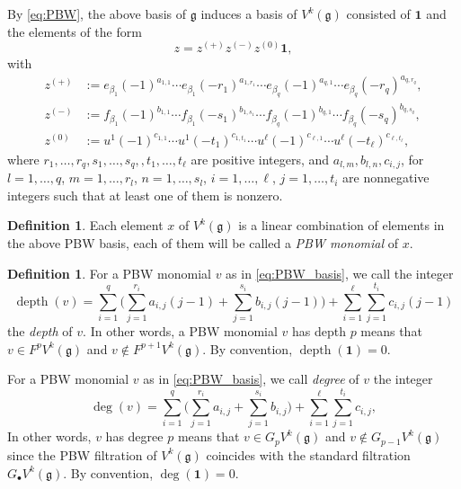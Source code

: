 \documentclass[11pt]{article}
\numberwithin{equation}{section}
\newcommand{\sbullet}{{\scriptscriptstyle\bullet}}
\let\be\beta
\DeclareMathOperator{\dep}{depth}
\newcommand \g{\mathfrak g}
\theoremstyle{definition}
\newtheorem{defn}[theorem]{Definition}
\begin{document}
By \eqref{eq:PBW},
the above basis of $\g$
induces a basis of $V^k(\g)$ consisted of $\mathbf{1}$
and the elements of the form
\begin{equation}
\label{eq:PBW_basis}
z = z^{(+)} z^{(-)} z^{(0)} \mathbf{1},
\end{equation}
with
\begin{align*}
z^{(+)} &:= e_{\be_{1}}(-1)^{a_{1,1}}\cdots
e_{\be_{1}} (- r_1)^{a_{1,r_1}}\cdots
e_{\be_q}(- 1)^{a_{q,1}}\cdots e_{\be_q}(- r_q)^{a_{q,r_q}}, \\
z^{(-)} &:=f_{\be_1}(-1)^{b_{1,1}}\cdots f_{\be_1}(- s_1)^{b_{1,s_1}}\cdots
f_{\be_q}(- 1)^{b_{q,1}}
\cdots f_{\be_q}(- s_q)^{b_{q,s_q}}, \\
z^{(0)} &:= u^1(- 1)^{c_{1,1}}\cdots u^1(- t_1)^{c_{1,t_1}}
\cdots u^\ell (- 1)^{c_{\ell,1}}\cdots u^\ell(- t_\ell)^{c_{\ell, t_\ell}},
\end{align*}
where $r_1,\dots,r_q, s_1,\dots,s_q,,t_1,\dots,t_\ell$
are positive integers, and $a_{l,m},b_{l,n},c_{i,j}$, for $l =1,\dots,q$,
$m=1,\dots,r_l$, $n=1,\dots,s_l$, $i = 1,\dots,\ell$, $j=1,\dots,t_i$
are nonnegative integers such
that at least one of them is nonzero.

\begin{defn}
\label{def:monomial_V}
Each element $x$ of $V^k(\g)$
is a linear combination of elements in the above PBW basis,
each of them will be called a \emph{PBW monomial} of $x$.
\end{defn}

\begin{defn}
\label{def:depth_V}
For a PBW monomial $v$ as in \eqref{eq:PBW_basis},
we call the integer
\begin{equation*}
\dep(v) =\sum_{i=1}^q \biggl(\sum_{j=1}^{r_i}
a_{i,j}(j-1) + \sum_{j=1}^{s_i} b_{i,j} (j-1) \biggr)
+ \sum_{i=1}^\ell \sum_{j=1}^{t_i} c_{i,j}(j-1)
\end{equation*}
the \emph{depth} of $v$.
In other words, a PBW monomial $v$ has depth $p$ means that
$v \in F^{p}V^k(\g)$ and $v \not \in F^{p+1}V^k(\g)$.
By convention, $\dep(\mathbf{1})=0$.

For a PBW monomial $v$ as in \eqref{eq:PBW_basis},
we call \emph{degree} of $v$ the integer
\begin{equation*}
\deg(v) =
\sum_{i=1}^q \biggl(\sum_{j=1}^{r_i}
a_{i,j} + \sum_{j=1}^{s_i} b_{i,j}\biggr)
+ \sum_{i=1}^\ell \sum_{j=1}^{t_i} c_{i,j},
\end{equation*}
In other words, $v$ has degree $p$ means that
$v \in G_{p}V^k(\g)$ and $v \not \in G_{p-1}V^k(\g)$
since the PBW filtration of $V^k(\g)$ coincides with the
standard filtration $G_\sbullet V^k(\g)$.
By convention, $\deg(\mathbf{1})=0$.
\end{defn}
\end{document}
